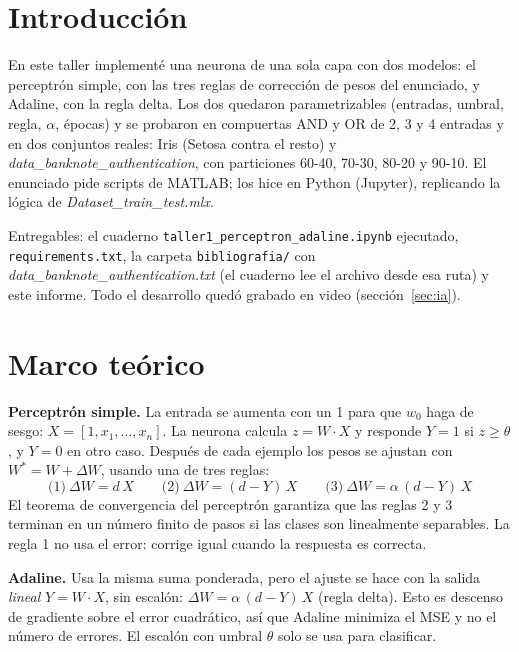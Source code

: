 \documentclass[11pt,letterpaper]{article}
\begin{document}
\UDportada

\section{Introducción}

En este taller implementé una neurona de una sola capa con dos modelos: el perceptrón simple, con las tres reglas de corrección de pesos del enunciado, y Adaline, con la regla delta. Los dos quedaron parametrizables (entradas, umbral, regla, $\alpha$, épocas) y se probaron en compuertas AND y OR de 2, 3 y 4 entradas y en dos conjuntos reales: Iris (Setosa contra el resto) y \textit{data\_banknote\_authentication}, con particiones 60-40, 70-30, 80-20 y 90-10. El enunciado pide scripts de MATLAB; los hice en Python (Jupyter), replicando la lógica de \textit{Dataset\_train\_test.mlx}.

Entregables: el cuaderno \texttt{taller1\_perceptron\_adaline.ipynb} ejecutado, \texttt{requirements.txt}, la carpeta \texttt{bibliografia/} con \textit{data\_banknote\_authentication.txt} (el cuaderno lee el archivo desde esa ruta) y este informe. Todo el desarrollo quedó grabado en video (sección~\ref{sec:ia}).

\section{Marco teórico}

\textbf{Perceptrón simple.} La entrada se aumenta con un 1 para que $w_0$ haga de sesgo: $X = [1, x_1, \dots, x_n]$. La neurona calcula $z = W \cdot X$ y responde $Y = 1$ si $z \ge \theta$, y $Y = 0$ en otro caso. Después de cada ejemplo los pesos se ajustan con $W^* = W + \Delta W$, usando una de tres reglas:
\begin{equation*}
\text{(1)}\ \Delta W = d\,X \qquad \text{(2)}\ \Delta W = (d - Y)\,X \qquad \text{(3)}\ \Delta W = \alpha\,(d - Y)\,X
\end{equation*}
El teorema de convergencia del perceptrón garantiza que las reglas 2 y 3 terminan en un número finito de pasos si las clases son linealmente separables. La regla 1 no usa el error: corrige igual cuando la respuesta es correcta.

\textbf{Adaline.} Usa la misma suma ponderada, pero el ajuste se hace con la salida \emph{lineal} $Y = W \cdot X$, sin escalón: $\Delta W = \alpha\,(d - Y)\,X$ (regla delta). Esto es descenso de gradiente sobre el error cuadrático, así que Adaline minimiza el MSE y no el número de errores. El escalón con umbral $\theta$ solo se usa para clasificar.
\end{document}
